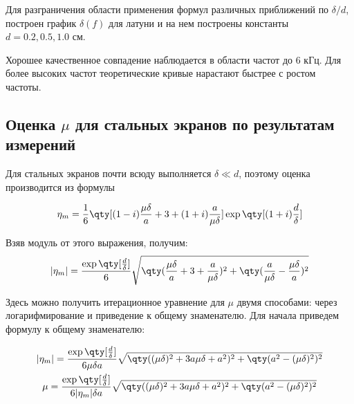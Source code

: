 Для разграничения области применения формул различных приближений по $\delta/d$, построен график $\delta(f)$ для латуни и на нем построены константы $d=0.2,0.5,1.0$ см.  

Хорошее качественное совпадение наблюдается в области частот до 6 кГц. Для более высоких частот теоретические кривые нарастают быстрее с ростом частоты.

\subsection{Оценка $\mu$ для стальных экранов по результатам измерений}

Для стальных экранов почти всюду выполняется $\delta \ll d$, поэтому оценка производится из формулы

\begin{gather}
	\eta_m = \frac16\qty[(1-i)\frac{\mu \delta}{a} + 3 + (1+i)\frac{a}{\mu \delta}]\exp\qty[(1+i)\frac{d}{\delta}]
\end{gather}

Взяв модуль от этого выражения, получим:
\begin{gather}
	|\eta_m| = \frac{\exp\qty[\frac{d}{\delta}]}{6}\sqrt{\qty(\frac{\mu \delta}{a} +3 + \frac{a}{\mu \delta} )^2 + \qty(\frac{a}{\mu \delta} - \frac{\mu \delta}{a})^2}
\end{gather}

Здесь можно получить итерационное уравнение для $\mu$ двумя способами: через логарифмирование и приведение к общему знаменателю. Для начала приведем формулу к общему знаменателю:

\begin{gather}
	|\eta_m| = \frac{\exp\qty[\frac{d}{\delta}]}{6 \mu \delta a}\sqrt{\qty((\mu \delta)^2 +3 a \mu \delta + a^2)^2 + \qty(a^2 - (\mu \delta)^2)^2}\\
%
	\mu = \frac{\exp\qty[\frac{d}{\delta}]}{6 |\eta_m| \delta a}\sqrt{\qty((\mu \delta)^2 +3 a \mu \delta + a^2)^2 + \qty(a^2 - (\mu \delta)^2)^2}
\end{gather}



